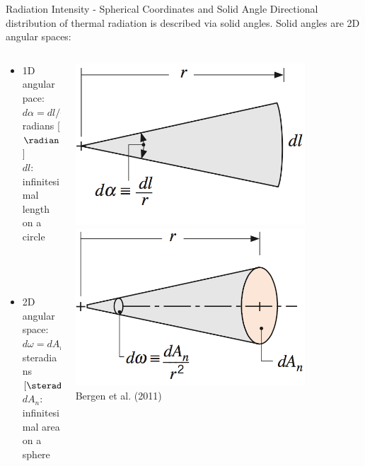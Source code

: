 \begin{frame}{Radiation Intensity - Spherical Coordinates  and Solid Angle}
Directional distribution of thermal radiation is described via solid angles. Solid angles are 2D angular spaces: 
\begin{columns}[T]
    \begin{column}{.6\textwidth}
    \begin{minipage}[c][.6\textheight][c]{\linewidth}
    \begin{itemize}
    \item 1D angular pace: $d\alpha = dl/r$\\
    radians [$\radian$]\\
	$dl$: infinitesimal length on a circle
	~\\~\\~\\~\\
	\item 2D angular space: $d\omega = dA_n/r^2$\\
	steradians $[\steradian]$\\
	$dA_n$: infinitesimal area on a sphere 
	\end{itemize}  
      \end{minipage}
    \end{column}
    \begin{column}{.45\textwidth}
    	\centering 
      \includegraphics[width=0.8\textwidth]{fig10a.png}\newline
      \includegraphics[width=0.8\textwidth]{fig10b.png}
      \centering \tiny~\\Bergen et al. (2011)
    \end{column}
  \end{columns} 
\end{frame}

